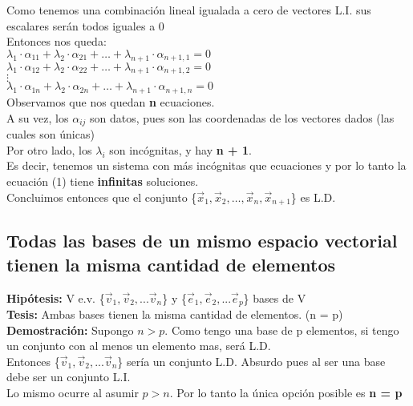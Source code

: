 \documentclass[11pt]{article}
\begin{document}
Como tenemos una combinación lineal igualada a cero de vectores L.I. sus escalares serán todos iguales a 0\\
Entonces nos queda: \\
$\lambda_1\cdot\alpha_{11} + \lambda_2\cdot\alpha_{21} + \hdots + \lambda_{n+1}\cdot\alpha_{n+1,1} = 0$\\
$\lambda_1\cdot\alpha_{12} + \lambda_2\cdot\alpha_{22} + \hdots + \lambda_{n+1}\cdot\alpha_{n+1,2} = 0$\\
$\vdots$\\
$\lambda_1\cdot\alpha_{1n} + \lambda_2\cdot\alpha_{2n} + \hdots + \lambda_{n+1}\cdot\alpha_{n+1,n}=0$\\
Observamos que nos quedan {\bfseries n} ecuaciones.\\
A su vez, los $\alpha_{ij}$ son datos, pues son las coordenadas de los vectores dados (las cuales son únicas)\\
Por otro lado, los $\lambda_i$ son incógnitas, y hay \textbf{n + 1}.\\
Es decir, tenemos un sistema con más incógnitas que ecuaciones y por lo tanto la ecuación (1) tiene {\bfseries infinitas} soluciones. \\
Concluimos entonces que el conjunto \{$\vec{x}_{1}, \vec{x}_2,\hdots, \vec{x}_n, \vec{x}_{n+1} $\} es L.D.
\subsection{Todas las bases de un mismo espacio vectorial tienen la misma cantidad de elementos}
{\bfseries {Hipótesis:}} V e.v. \{$\vec{v}_{1}, \vec{v}_2,... \vec{v}_n $\} y \{$\vec{e}_{1}, \vec{e}_2,... \vec{e}_p $\} bases de V\\
{\bfseries {Tesis:}} Ambas bases tienen la misma cantidad de elementos. (n = p)\\
{\bfseries Demostración:} Supongo $n>p$. Como tengo una base de p elementos, si tengo un conjunto con al menos un elemento mas, será L.D.\\
Entonces \{$\vec{v}_{1}, \vec{v}_2,... \vec{v}_n $\} sería un conjunto L.D. Absurdo pues al ser una base debe ser un conjunto L.I.\\
Lo mismo ocurre al asumir $p>n$. Por lo tanto la única opción posible es {\bfseries n = p}
\end{document}
